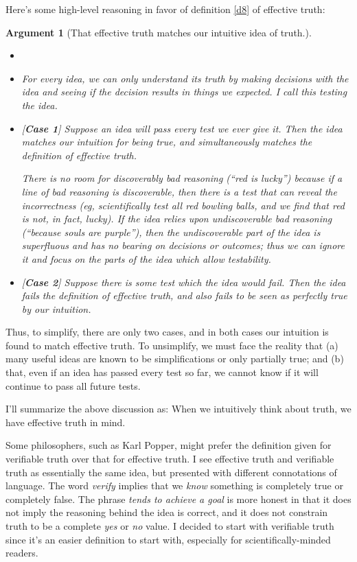 \documentclass[11pt, oneside]{article}   	%
\newenvironment{answer}[1]
  {\renewcommand\theinnercustomthm{#1}\innercustomthm}
  {\endinnercustomthm}
\newtheorem{argt}{Argument}
\begin{document}
Here's some high-level reasoning in favor of definition \ref{d8} of
effective truth:
\begin{argt}[That effective truth matches our intuitive idea of truth.]
    \normalfont
\begin{itemize}
    \item[]
    \item For every idea, we can only understand its truth by making decisions
        with the idea and seeing if the decision results in things we expected.
        I call this {\em testing the idea.}
    \item{} [{\bf Case 1}]
        Suppose an idea will pass every test we ever give it. Then
        the idea
        matches our intuition for being true, and simultaneously matches the
        definition of effective truth.

        There is no room for discoverably
        bad reasoning (``red is lucky'')
        because if a line of bad reasoning is discoverable,
        then there is a test that can reveal the incorrectness
        (eg, scientifically test all red bowling balls, and we find that red is
        not, in fact, lucky).
        If the idea
        relies upon undiscoverable bad reasoning (``because souls are purple''),
        then the undiscoverable part of the idea is superfluous and has no
        bearing on decisions or outcomes; thus we can ignore it and focus on the
        parts of the idea which allow testability.
    \item{} [{\bf Case 2}]
        Suppose there is some test which the idea would fail.
        Then the idea fails the definition of
        effective truth, and also fails to be seen as perfectly true by our
        intuition.
\end{itemize}
\end{argt}
Thus, to simplify, there are only two cases, and in both cases our intuition is
found to match effective truth. To unsimplify, we must face the reality that (a)
many useful ideas are known to be simplifications or only partially true; and
(b) that, even if an idea has passed every test so far, we cannot know if it
will continue to pass all future tests.

I'll summarize the above discussion as:
\begin{answer}{3b.}
    When we intuitively think about truth, we have effective truth in mind.
\end{answer}

Some philosophers, such as Karl Popper, might prefer the definition given for
verifiable truth over that for effective truth.
I see effective truth and verifiable truth as essentially the
same idea, but presented with different connotations of language. The word {\em
verify} implies that we {\em know} something is completely true or completely
false. The phrase {\em tends to achieve a goal}
is more honest in that it does not imply the reasoning behind the idea is
correct, and it does not constrain truth to be a complete {\em yes} or {\em no}
value. I decided to start with verifiable truth since it's an easier definition
to start with, especially for scientifically-minded readers.
\end{document}
